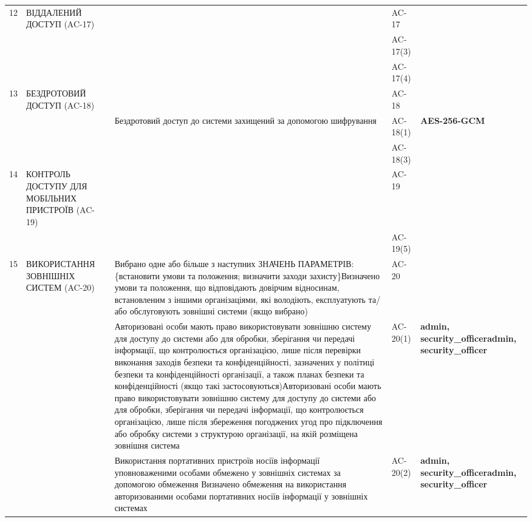 \documentclass[10pt]{article}
\begin{document}
\begin{longtable}{|c|>{\raggedright\arraybackslash}p{4cm}|>{\raggedright\arraybackslash}p{6cm}|>{\raggedright\arraybackslash}p{2cm}|>{\raggedright\arraybackslash}p{4cm}|}
12 & ВІДДАЛЕНИЙ ДОСТУП (AC-17) &  & AC-17 &  \\ \cline{3-5}
 &  &  & AC-17(3) &  \\ \cline{3-5}
 &  &  & AC-17(4) &  \\ \hline
13 & БЕЗДРОТОВИЙ ДОСТУП (AC-18) &  & AC-18 &  \\ \cline{3-5}
 &  & Бездротовий доступ до системи захищений за допомогою шифрування & AC-18(1) & \textbf{AES-256-GCM} \\ \cline{3-5}
 &  &  & AC-18(3) &  \\ \hline
14 & КОНТРОЛЬ ДОСТУПУ ДЛЯ МОБІЛЬНИХ ПРИСТРОЇВ (AC-19) &  & AC-19 &  \\ \cline{3-5}
 &  &  & AC-19(5) &  \\ \hline
15 & ВИКОРИСТАННЯ ЗОВНІШНІХ СИСТЕМ (AC-20) & Вибрано одне або більше з наступних ЗНАЧЕНЬ ПАРАМЕТРІВ: \{встановити умови та положення; визначити заходи захисту\}\newline Визначено умови та положення, що відповідають довірчим відносинам, встановленим з іншими організаціями, які володіють, експлуатують та/або обслуговують зовнішні системи (якщо вибрано) & AC-20 & \textbf{}\newline \textbf{} \\ \cline{3-5}
 &  & Авторизовані особи мають право використовувати зовнішню систему для доступу до системи або для обробки, зберігання чи передачі інформації, що контролюється організацією, лише після перевірки виконання заходів безпеки та конфіденційності, зазначених у політиці безпеки та конфіденційності організації, а також планах безпеки та конфіденційності (якщо такі застосовуються)\newline Авторизовані особи мають право використовувати зовнішню систему для доступу до системи або для обробки, зберігання чи передачі інформації, що контролюється організацією, лише після збереження погоджених угод про підключення або обробку системи з структурою організації, на якій розміщена зовнішня система & AC-20(1) & \textbf{admin, security\_\allowbreak{}officer}\newline \textbf{admin, security\_\allowbreak{}officer} \\ \cline{3-5}
 &  & Використання портативних пристроїв носіїв інформації уповноваженими особами обмежено у зовнішніх системах за допомогою обмеження \newline Визначено обмеження на використання авторизованими особами портативних носіїв інформації у зовнішніх системах & AC-20(2) & \textbf{admin, security\_\allowbreak{}officer}\newline \textbf{admin, security\_\allowbreak{}officer} \\ \hline

\end{longtable}
\end{document}
